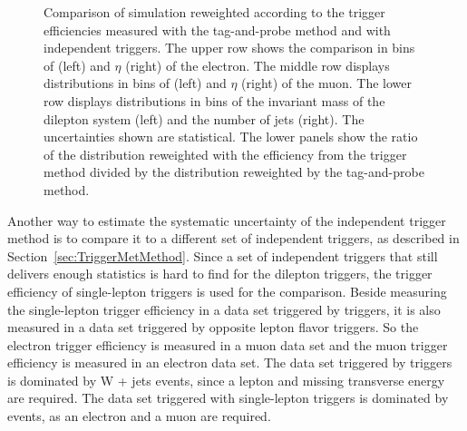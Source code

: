 \begin{figure}[htbp!]
\begin{center}
      \caption{Comparison of \ttbar simulation reweighted according to the trigger efficiencies measured with the tag-and-probe method and with independent \ETm triggers.
       The upper row shows the comparison in bins of \pt (left) and $\eta$ (right) of the electron. The middle row displays distributions in bins of \pt (left) and $\eta$ (right) of the muon. The lower row displays distributions in bins of the invariant mass of the dilepton system (left) and the number of jets (right). The uncertainties shown are statistical. The lower panels show the ratio of the distribution reweighted with the efficiency from the \ETm trigger method divided by the distribution reweighted by the tag-and-probe method. }  
    \label{fig:Clos_emu}
  \end{center}
\end{figure}

Another way to estimate the systematic uncertainty of the independent trigger method is to compare it to a different set of independent triggers, as described in Section~\ref{sec:TriggerMetMethod}.
Since a set of independent triggers that still delivers enough statistics is hard to find for the dilepton triggers, the trigger efficiency of single-lepton triggers is used for the comparison.
Beside measuring the single-lepton trigger efficiency in a data set triggered by \ETm triggers, it is also measured in a data set triggered by opposite lepton flavor triggers.
So the electron trigger efficiency is measured in a muon data set and the muon trigger efficiency is measured in an electron data set.
The data set triggered by \ETm triggers is dominated by W + jets events, since a lepton and missing transverse energy are required.
The data set triggered with single-lepton triggers is dominated by \ttbar events, as an electron and a muon are required.

